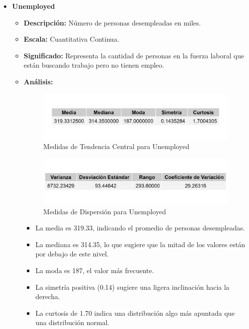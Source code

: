 \documentclass{article}
\begin{document}
\begin{itemize}
    \item \textbf{Unemployed}
    \begin{itemize}
        \item \textbf{Descripción:} Número de personas desempleadas en miles.
        \item \textbf{Escala:} Cuantitativa Continua.
        \item \textbf{Significado:} Representa la cantidad de personas en la fuerza laboral que están buscando trabajo pero no tienen empleo.
        \item \textbf{Análisis:} 
        \begin{figure}[H]
            \centering
            \includegraphics[width=\textwidth]{MTC/Unemployed_central.png}
            \caption{Medidas de Tendencia Central para Unemployed}
        \end{figure}
        \begin{figure}[H]
            \centering
            \includegraphics[width=\textwidth]{MTC/Unemployed_dispersion.png}
            \caption{Medidas de Dispersión para Unemployed}
        \end{figure}
            \begin{itemize}
                \item La media es 319.33, indicando el promedio de personas desempleadas.
                \item La mediana es 314.35, lo que sugiere que la mitad de los valores están por debajo de este nivel.
                \item La moda es 187, el valor más frecuente.
                \item La simetría positiva (0.14) sugiere una ligera inclinación hacia la derecha.
                \item La curtosis de 1.70 indica una distribución algo más apuntada que una distribución normal.

\end{itemize}
\end{itemize}
\end{itemize}
\end{document}
